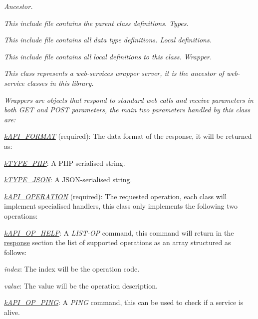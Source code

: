 {\itshape Ancestor.}

{\itshape This include file contains the parent class definitions. Types.}

{\itshape This include file contains all data type definitions. Local definitions.}

{\itshape This include file contains all local definitions to this class. Wrapper.}

{\itshape This class represents a web-\/services wrapper server, it is the ancestor of web-\/service classes in this library.}

{\itshape Wrappers are objects that respond to standard web calls and receive parameters in both {\itshape G\-E\-T} and {\itshape P\-O\-S\-T} parameters, the main two parameters handled by this class are\-:}

{\itshape 
\begin{DoxyItemize}
\item {\itshape \hyperlink{}{k\-A\-P\-I\-\_\-\-F\-O\-R\-M\-A\-T}} (required)\-: The data format of the response, it will be returned as\-: 
\begin{DoxyItemize}
\item {\itshape \hyperlink{}{k\-T\-Y\-P\-E\-\_\-\-P\-H\-P}}\-: A P\-H\-P-\/serialised string. 
\item {\itshape \hyperlink{}{k\-T\-Y\-P\-E\-\_\-\-J\-S\-O\-N}}\-: A J\-S\-O\-N-\/serialised string. 
\end{DoxyItemize}
\item {\itshape \hyperlink{}{k\-A\-P\-I\-\_\-\-O\-P\-E\-R\-A\-T\-I\-O\-N}} (required)\-: The requested operation, each class will implement specialised handlers, this class only implements the following two operations\-: 
\begin{DoxyItemize}
\item {\itshape \hyperlink{}{k\-A\-P\-I\-\_\-\-O\-P\-\_\-\-H\-E\-L\-P}}\-: A {\itshape L\-I\-S\-T-\/\-O\-P} command, this command will return in the \hyperlink{}{response} section the list of supported operations as an array structured as follows\-: 
\begin{DoxyItemize}
\item {\itshape index}\-: The index will be the operation code. 
\item {\itshape value}\-: The value will be the operation description. 
\end{DoxyItemize}
\item {\itshape \hyperlink{}{k\-A\-P\-I\-\_\-\-O\-P\-\_\-\-P\-I\-N\-G}}\-: A {\itshape P\-I\-N\-G} command, this can be used to check if a service is alive. 
\end{DoxyItemize}
\end{DoxyItemize}}

